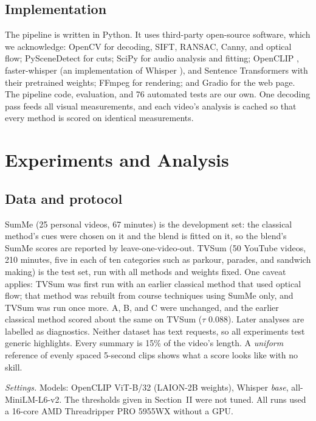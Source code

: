 \documentclass[conference]{IEEEtran}
\begin{document}
\subsection{Implementation}
The pipeline is written in Python. It uses third-party open-source software, which we acknowledge: OpenCV \cite{opencv} for decoding, SIFT, RANSAC, Canny, and optical flow; PySceneDetect \cite{pyscenedetect} for cuts; SciPy for audio analysis and fitting; OpenCLIP \cite{openclip}, faster-whisper (an implementation of Whisper \cite{radford2023whisper}), and Sentence Transformers \cite{reimers2019sbert} with their pretrained weights; FFmpeg for rendering; and Gradio for the web page. The pipeline code, evaluation, and 76 automated tests are our own. One decoding pass feeds all visual measurements, and each video's analysis is cached so that every method is scored on identical measurements.

\section{Experiments and Analysis}
\subsection{Data and protocol}
SumMe (25 personal videos, 67 minutes) is the development set: the classical method's cues were chosen on it and the blend is fitted on it, so the blend's SumMe scores are reported by leave-one-video-out. TVSum (50 YouTube videos, 210 minutes, five in each of ten categories such as parkour, parades, and sandwich making) is the test set, run with all methods and weights fixed. One caveat applies: TVSum was first run with an earlier classical method that used optical flow; that method was rebuilt from course techniques using SumMe only, and TVSum was run once more. A, B, and C were unchanged, and the earlier classical method scored about the same on TVSum ($\tau$ 0.088). Later analyses are labelled as diagnostics. Neither dataset has text requests, so all experiments test generic highlights. Every summary is 15\% of the video's length. A \emph{uniform} reference of evenly spaced 5-second clips shows what a score looks like with no skill.

\emph{Settings.} Models: OpenCLIP ViT-B/32 (LAION-2B weights), Whisper \emph{base}, all-MiniLM-L6-v2. The thresholds given in Section~II were not tuned. All runs used a 16-core AMD Threadripper PRO 5955WX without a GPU.
\end{document}
